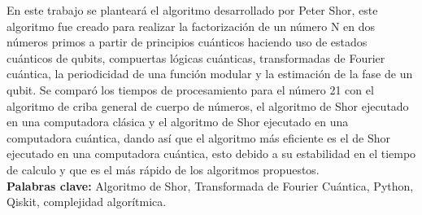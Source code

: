 En este trabajo se planteará el algoritmo desarrollado por Peter Shor, este algoritmo fue creado para realizar la factorización de un número 
N en dos números primos a partir de principios cuánticos haciendo uso de estados cuánticos de qubits, compuertas lógicas cuánticas, transformadas de Fourier cuántica,
la periodicidad de una función modular y la estimación de la fase de un qubit. Se comparó los tiempos de procesamiento para el número 21 con el algoritmo de criba general de cuerpo
de números, el algoritmo de Shor ejecutado en una computadora clásica y el algoritmo de Shor ejecutado en una computadora cuántica, dando así que el algoritmo más eficiente
es el de Shor ejecutado en una computadora cuántica, esto debido a su estabilidad en el tiempo de calculo y que es el más rápido de los algoritmos propuestos.\\
\textbf{Palabras clave:} Algoritmo de Shor, Transformada de Fourier Cuántica, Python, Qiskit, complejidad algorítmica.